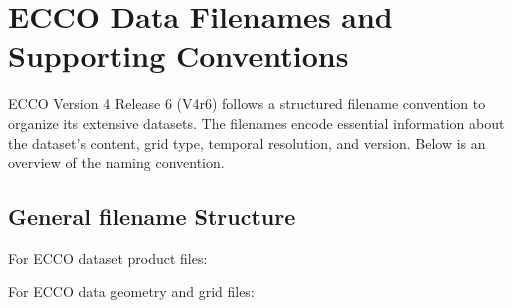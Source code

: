 \pagebreak
\section{ECCO Data Filenames and Supporting Conventions}


ECCO Version 4 Release 6 (V4r6) follows a structured filename convention to organize its extensive datasets. The filenames encode essential information about the dataset's content, grid type, temporal resolution, and version. Below is an overview of the naming convention.

\subsection{General filename Structure}
\par \vspace{0.25cm}

\par For ECCO dataset product files:

\par \vspace{0.5cm}
\begin{center}
\small{\textbf{\selectfont{[ShortName]\_[TemporalResolution]\_[Indicative Time]\_ECCO\_[Version]\_[GridType].<File Type>}}}
\end{center}
\par \vspace{0.5cm}
\par For ECCO data geometry and grid files:

\par \vspace{0.5cm}
\begin{center}
    \small{\textbf{\selectfont{[ShortName]\_ECCO\_[Version]\_[GridType].<File Type>}}}
\end{center}
\par \vspace{0.25cm}

